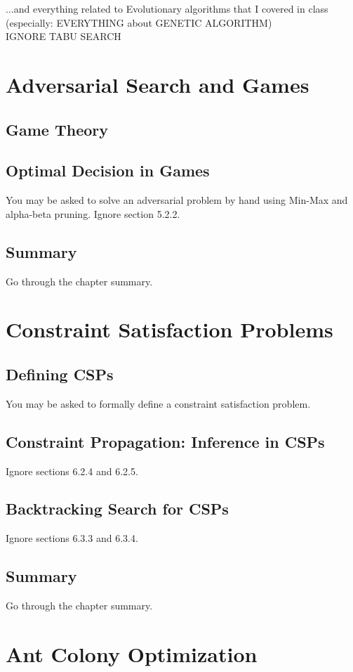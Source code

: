 \documentclass[exam={Midterm}]{cs581exam}
\begin{document}
$\dots$and everything related to Evolutionary algorithms that I covered in class (especially: EVERYTHING about GENETIC ALGORITHM)\\
IGNORE TABU SEARCH


\section{Adversarial Search and Games}\label{sec:adversarial-search-and-games}
\subsection{Game Theory}\label{subsec:5.1}
\subsection{Optimal Decision in Games}\label{subsec:5.2}
You may be asked to solve an adversarial problem by hand using Min-Max
and alpha-beta pruning. Ignore section 5.2.2.
\subsection{Summary}\label{subsec:5-summary}
Go through the chapter summary.

\section{Constraint Satisfaction Problems}\label{sec:constraint-satisfaction-problems}
\subsection{Defining CSPs}\label{subsec:6.1}
You may be asked to formally define a constraint satisfaction problem.
\subsection{Constraint Propagation: Inference in CSPs}\label{subsec:6.2}
Ignore sections 6.2.4 and 6.2.5.
\subsection{Backtracking Search for CSPs}\label{subsec:6.3}
Ignore sections 6.3.3 and 6.3.4.
\subsection{Summary}\label{subsec:6-summary}
Go through the chapter summary.

\section{Ant Colony Optimization}\label{sec:ant-colony-optimization}
\end{document}
